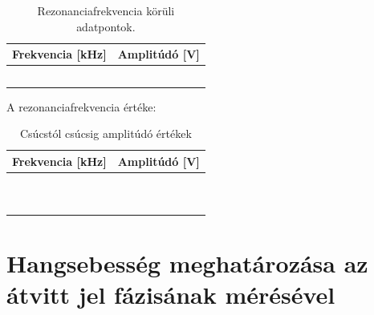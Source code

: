 \documentclass{article}
\begin{document}
\begin{table}[h!]
    \centering
    \begin{tabular}{|c|c|}
        \hline
        Frekvencia [kHz] & Amplitúdó [V] \\ \hline
         &  \\ \hline
         &  \\ \hline
         &  \\ \hline
         &  \\ \hline
         &  \\ \hline
    \end{tabular}
    \caption{Rezonanciafrekvencia körüli adatpontok.}
    \label{rezonancia freki}
\end{table}


A rezonanciafrekvencia értéke:


\begin{table}[h!]
    \centering
    \begin{tabular}{|c|c|}
        \hline
        Frekvencia [kHz] & Amplitúdó [V] \\ \hline
         &  \\ \hline
         &  \\ \hline
         &  \\ \hline
         &  \\ \hline
         &  \\ \hline

         &  \\ \hline
         &  \\ \hline
         &  \\ \hline
         &  \\ \hline
         &  \\ \hline
    \end{tabular}
    \caption{Csúcstól csúcsig amplitúdó értékek}
    \label{Vpp}
\end{table}


\section{Hangsebesség meghatározása az átvitt jel fázisának mérésével}
\end{document}

